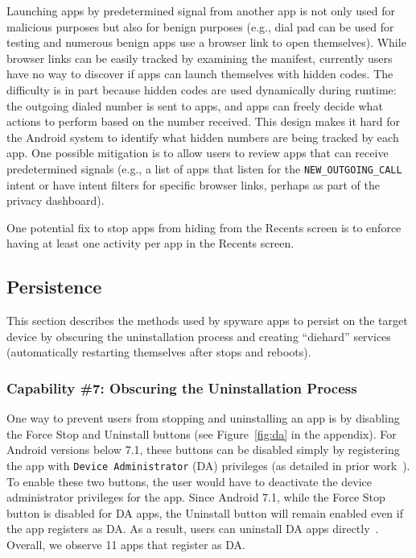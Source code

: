 Launching apps by predetermined signal from another app is not only used for
malicious purposes but also for benign purposes (e.g., dial pad can be used for
testing and numerous benign apps use a browser link to open themselves).
While browser links can be easily tracked by examining the manifest, currently
users have no way to discover if apps can launch themselves with hidden codes.
The difficulty is in part because hidden codes are used dynamically during
runtime: the outgoing dialed number is sent to apps, and apps can freely decide
what actions to perform based on the number received. This design makes it hard
for the Android system to identify what hidden numbers are being tracked by each
app.  One possible mitigation is to allow users to review apps that can receive predetermined signals (e.g., a list of apps that listen for the
\texttt{NEW\_OUTGOING\_CALL} intent or have intent filters for specific browser links,
perhaps as part of the privacy dashboard).

One potential fix to stop apps from hiding from the Recents screen is to enforce
having at least one activity per app in the Recents screen.




\subsection{Persistence}
\label{subsec:persistence}
This section describes the methods used by spyware apps to persist on the target
device by obscuring the uninstallation process and creating ``diehard'' services
(automatically restarting themselves after stops and reboots).


\subsubsection*{Capability \#7: Obscuring the Uninstallation Process}

One way to prevent users from stopping and uninstalling an app is by
disabling the Force Stop and Uninstall buttons (see
Figure~\ref{fig:da} in the appendix).  For Android versions below 7.1,
these buttons can be disabled simply by registering the app with
\texttt{Device Administrator} (DA) privileges (as detailed in prior
work~\cite{shan2019device}). To enable these two buttons, the user
would have to deactivate the device administrator privileges for the
app.
%
Since Android 7.1, while the Force Stop button is disabled for DA
apps, the Uninstall button will remain enabled even if the app
registers as DA.  As a result, users can uninstall DA apps
directly~\cite{shan2019device}. Overall, we observe 11 apps that
register as DA.

